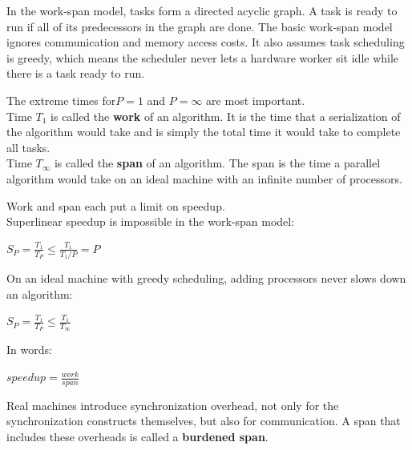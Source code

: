In the work-span model, tasks form a directed acyclic graph. A task is ready to run if all of its predecessors in the graph are done. 
The basic work-span model ignores communication and memory access costs. It also assumes task scheduling is greedy, which means the scheduler never lets a hardware worker sit idle while there is a task ready to run.

The extreme times for\(P=1\) and \(P=\infty\) are most important.\\
Time \(T_{1}\) is called the \textbf{work} of an algorithm. It is the time that a serialization of the algorithm would take and is simply the total time it would take to complete all tasks.\\
Time \(T_{\infty}\) is called the \textbf{span} of an algorithm. The span is the time a parallel algorithm would take on an ideal machine with an infinite number of processors.

Work and span each put a limit on speedup.\\ Superlinear speedup is impossible in the work-span
model:
\begin{center}
	\(S_{P} = \frac{T_{1}}{T_{P}} \leq \frac{T_{1}}{T_{1}/P} = P\)
\end{center}
On an ideal machine with greedy scheduling, adding processors never slows down an algorithm:
\begin{center}
	\(S_{P} = \frac{T_{1}}{T_{P}} \leq \frac{T_{1}}{T_{\infty}}\)
\end{center}
In words:
\begin{center}
	\(speedup = \frac{work}{span}\)
\end{center}
Real machines introduce synchronization overhead, not only for the synchronization constructs themselves, but also for communication. A span that includes these overheads is called a \textbf{burdened span}.

